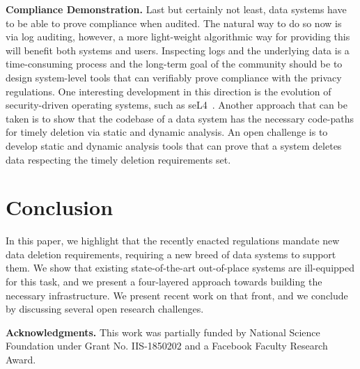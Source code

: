 \documentclass[11pt,dvipdfmx]{article}
\newcommand\Paragraph[1]{\vspace{0.02in}  \noindent \textbf{#1.}}
\begin{document}
\Paragraph{Compliance Demonstration} 
Last but certainly not least, data systems have to be able to prove compliance
when audited. The natural way to do so now is via log auditing, however, a more
light-weight algorithmic way for providing this will benefit both systems and users.
Inspecting logs and the underlying data is a time-consuming process and the 
long-term goal of the community should be to design system-level tools that can 
verifiably prove compliance with the privacy regulations. 
One interesting development in this direction is the evolution of security-driven 
operating systems, such as seL4~\cite{Klein2010,SeL4}. 
Another approach that can be taken is to show that the codebase of a data system
has the necessary code-paths for timely deletion via static and dynamic analysis.
An open challenge is to develop static and dynamic analysis tools that can prove
that a system deletes data respecting the timely deletion requirements set.









 
\section{Conclusion}
\label{sec:conclusion}
\vspace{-0.075in}

In this paper, we highlight that the recently enacted regulations  mandate
new data deletion requirements, requiring a new breed of data systems to support
them. We show that existing state-of-the-art out-of-place systems are ill-equipped
for this task, and we present a four-layered approach towards building the necessary
infrastructure. We present recent work on that front, and we conclude by discussing
several open research challenges.

\Paragraph{Acknowledgments} This work was partially funded by National
Science Foundation under Grant No. IIS-1850202 and a Facebook
Faculty Research Award.




 
\end{document}
